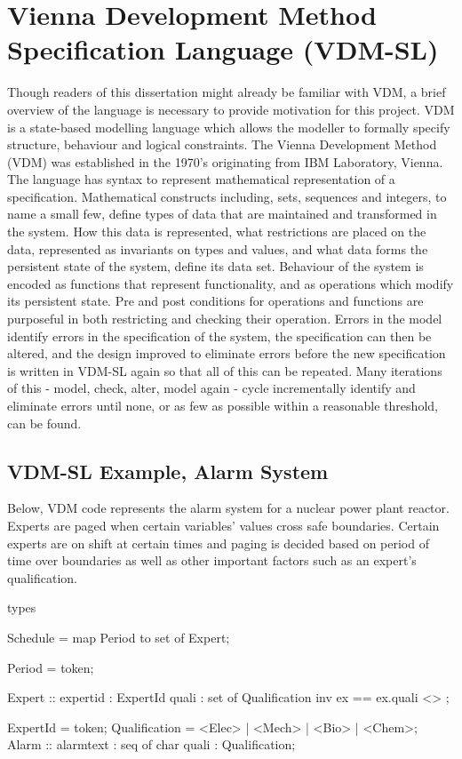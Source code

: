 \section{Vienna Development Method Specification Language (VDM-SL)}
Though readers of this dissertation might already be familiar with VDM, a brief overview of the language is necessary to provide motivation for this project. VDM is a state-based modelling language which allows the modeller to formally specify structure, behaviour and logical constraints. The Vienna Development Method (VDM) was established in the 1970's originating from IBM Laboratory, Vienna. The language has syntax to represent mathematical representation of a specification. Mathematical constructs including, sets, sequences and integers, to name a small few, define types of data that are maintained and transformed in the system. How this data is represented, what restrictions are placed on the data, represented as invariants on types and values, and what data forms the persistent state of the system, define its data set. Behaviour of the system is encoded as functions that represent functionality, and as operations which modify its persistent state. Pre and post conditions for operations and functions are purposeful in both restricting and checking their operation. Errors in the model identify errors in the specification of the system, the specification can then be altered, and the design improved to eliminate errors before the new specification is written in VDM-SL again so that all of this can be repeated. Many iterations of this - model, check, alter, model again - cycle incrementally identify and eliminate errors until none, or as few as possible within a reasonable threshold, can be found.



\subsection{VDM-SL Example, Alarm System}
Below, VDM code represents the alarm system for a nuclear power plant reactor. Experts are paged when certain variables' values cross safe boundaries. Certain experts are on shift at certain times and paging is decided based on period of time over boundaries as well as other important factors such as an expert’s qualification.


\begin{vdmsl}[label=lst:AlarmSL.vdmsl,caption=Types of data used in the alarm system in VDM-SL]
types

Schedule = map Period to set of Expert;

Period = token;

Expert :: expertid : ExpertId
quali : set of Qualification
inv ex == ex.quali <> {};

ExpertId = token;
Qualification = <Elec> | <Mech> | <Bio> | <Chem>;
Alarm :: alarmtext : seq of char
quali : Qualification;
\end{vdmsl}

